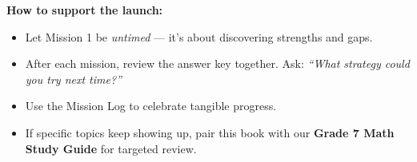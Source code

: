 {\begin{tcolorbox}
    \medskip
    \textbf{How to support the launch:}
    \begin{itemize}[leftmargin=*, itemsep=1pt]
        \item Let Mission 1 be \textit{untimed} --- it's about discovering strengths and gaps.
        \item After each mission, review the answer key together. Ask: \textit{``What strategy could you try next time?''}
        \item Use the Mission Log to celebrate tangible progress.
        \item If specific topics keep showing up, pair this book with our
            \textbf{Grade 7 Math Study Guide} for targeted review.
    \end{itemize}
\end{tcolorbox}

}

\newpage
